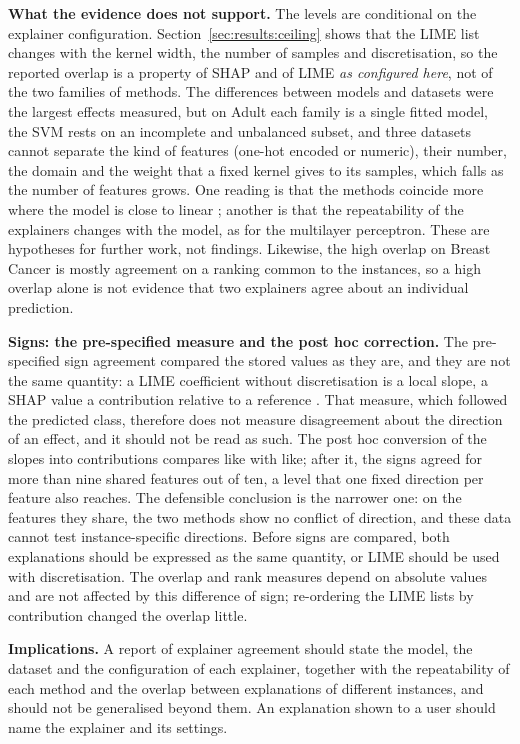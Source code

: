 \textbf{What the evidence does not support.} The levels are conditional on the explainer
configuration. Section~\ref{sec:results:ceiling} shows that the LIME list changes with the
kernel width, the number of samples and discretisation, so the reported overlap is a
property of SHAP and of LIME \emph{as configured here}, not of the two families of methods.
The differences between models and datasets were the largest effects measured, but on Adult
each family is a single fitted model, the SVM rests on an incomplete and unbalanced subset,
and three datasets cannot separate the kind of features (one-hot encoded or numeric), their
number, the domain and the weight that a fixed kernel gives to its samples, which falls as
the number of features grows. One reading is that the methods coincide more where the model
is close to linear \cite{han2022which}; another is that the repeatability of the explainers
changes with the model, as for the multilayer perceptron. These are hypotheses for further
work, not findings. Likewise, the high overlap on Breast Cancer is mostly agreement on a
ranking common to the instances, so a high overlap alone is not evidence that two explainers
agree about an individual prediction.

\textbf{Signs: the pre-specified measure and the post hoc correction.} The pre-specified
sign agreement compared the stored values as they are, and they are not the same quantity:
a LIME coefficient without discretisation is a local slope, a SHAP value a contribution
relative to a reference \cite{garreau2020explaining,lundberg2017unified}. That measure,
which followed the predicted class, therefore does not measure disagreement about the
direction of an effect, and it should not be read as such. The post hoc conversion of the
slopes into contributions compares like with like; after it, the signs agreed for more than
nine shared features out of ten, a level that one fixed direction per feature also reaches.
The defensible conclusion is the narrower one: on the features they share, the two methods
show no conflict of direction, and these data cannot test instance-specific directions.
Before signs are compared, both explanations should be expressed as the same quantity, or
LIME should be used with discretisation. The overlap and rank measures depend on absolute
values and are not affected by this difference of sign; re-ordering the LIME lists by
contribution changed the overlap little.

\textbf{Implications.} A report of explainer agreement should state the model, the dataset
and the configuration of each explainer, together with the repeatability of each method and
the overlap between explanations of different instances, and should not be generalised
beyond them. An explanation shown to a user should name the explainer and its settings.

